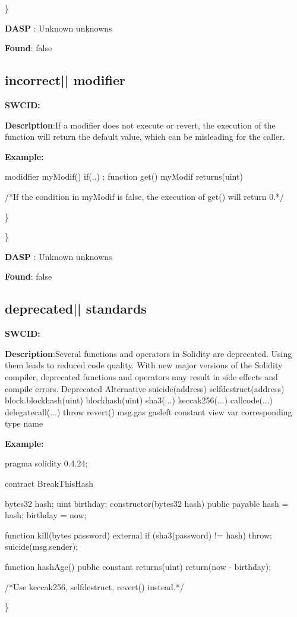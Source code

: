 \documentclass{article}
\begin{document}
\} 

\textbf{DASP} : Unknown unknowns

\textbf{Found}: false

\subsection{incorrect{|\textunderscore| }modifier} 
\textbf{SWC{\textunderscore }ID:} 

\textbf{Description}:If a modifier does not execute \textunderscore  or revert, the execution of the function will return the default value, which can be misleading for the caller.


\textbf{Example:} 
\begin{ffcode} 

modidfier myModif(){
    if(..){
      \textunderscore ;
    }
}
function get() myModif returns(uint){}

 /*If the condition in myModif is false, the execution of get() will return 0.*/ 

\end{ffcode} 
\} 

\} 

\textbf{DASP} : Unknown unknowns

\textbf{Found}: false

\subsection{deprecated{|\textunderscore| }standards} 
\textbf{SWC{\textunderscore }ID:} 

\textbf{Description}:Several functions and operators in Solidity are deprecated. Using them leads to reduced code quality. With new major versions of the Solidity compiler, deprecated functions and operators may result in side effects and compile errors.
  Deprecated              Alternative
  suicide(address)        selfdestruct(address)
  block.blockhash(uint)   blockhash(uint)
  sha3(...)               keccak256(...)
  callcode(...)           delegatecall(...)
  throw                   revert()
  msg.gas                 gasleft
  constant                view
  var                     corresponding type name


\textbf{Example:} 
\begin{ffcode} 

pragma solidity 0.4.24;

contract BreakThisHash {
    bytes32 hash;
    uint birthday;
    constructor(bytes32 \textunderscore hash) public payable {
        hash = \textunderscore hash;
        birthday = now;
    }

    function kill(bytes password) external {
        if (sha3(password) != hash) {
            throw;
        }
        suicide(msg.sender);
    }

    function hashAge() public constant returns(uint) {
        return(now - birthday);
    }
}

 /*Use keccak256, selfdestruct, revert() instead.*/ 

\end{ffcode} 
\} 
\end{document}
